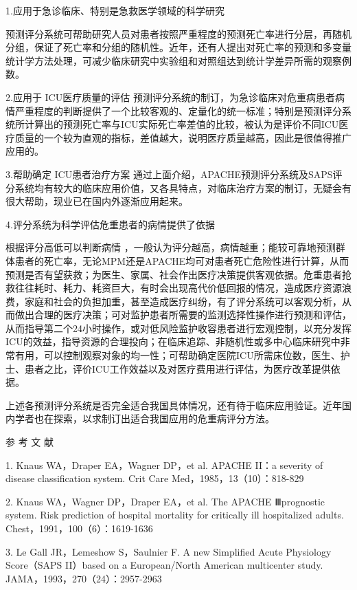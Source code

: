 1.应用于急诊临床、特别是急救医学领域的科学研究

预测评分系统可帮助研究人员对患者按照严重程度的预测死亡率进行分层，再随机分组，保证了死亡率和分组的随机性。近年，还有人提出对死亡率的预测和多变量统计学方法处理，可减少临床研究中实验组和对照组达到统计学差异所需的观察例数。

2.应用于 ICU医疗质量的评估
预测评分系统的制订，为急诊临床对危重病患者病情严重程度的判断提供了一个比较客观的、定量化的统一标准；特别是预测评分系统所计算出的预测死亡率与ICU实际死亡率差值的比较，被认为是评价不同ICU医疗质量的一个较为直观的指标，差值越大，说明医疗质量越高，因此是很值得推广应用的。

3.帮助确定 ICU患者治疗方案
通过上面介绍，APACHE预测评分系统及SAPS评分系统均有较大的临床应用价值，又各具特点，对临床治疗方案的制订，无疑会有很大帮助，现业已在国内外逐渐应用起来。

4.评分系统为科学评估危重患者的病情提供了依据

根据评分高低可以判断病情
，一般认为评分越高，病情越重；能较可靠地预测群体患者的死亡率，无论MPM还是APACHE均可对患者死亡危险性进行计算，从而预测是否有望获救；为医生、家属、社会作出医疗决策提供客观依据。危重患者抢救往往耗时、耗力、耗资巨大，有时会出现高代价低回报的情况，造成医疗资源浪费，家庭和社会的负担加重，甚至造成医疗纠纷，有了评分系统可以客观分析，从而做出合理的医疗决策；可对监护患者所需要的监测选择性操作进行预测和评估，从而指导第二个24小时操作，或对低风险监护收容患者进行宏观控制，以充分发挥ICU的效益，指导资源的合理投向；在临床追踪、非随机性或多中心临床研究中非常有用，可以控制观察对象的均一性；可帮助确定医院ICU所需床位数，医生、护士、患者之比，评价ICU工作效益以及对医疗费用进行评估，为医疗改革提供依据。

上述各预测评分系统是否完全适合我国具体情况，还有待于临床应用验证。近年国内学者也在探索，以求制订出适合我国应用的危重病评分方法。

\protect\hypertarget{text00402.html}{}{}

\hypertarget{text00402.htmlux5cux23CHP16-14-5}{}
参 考 文 献

1. Knaus WA，Draper EA，Wagner DP，et al. APACHE II：a severity of
disease classification system. Crit Care Med，1985，13（10）：818-829

2. Knaus WA，Wagner DP，Draper EA，et al. The APACHE Ⅲprognostic system.
Risk prediction of hospital mortality for critically ill hospitalized
adults. Chest，1991，100（6）：1619-1636

3. Le Gall JR，Lemeshow S，Saulnier F. A new Simplified Acute Physiology
Score（SAPS II）based on a European/North American multicenter study.
JAMA，1993，270（24）：2957-2963


